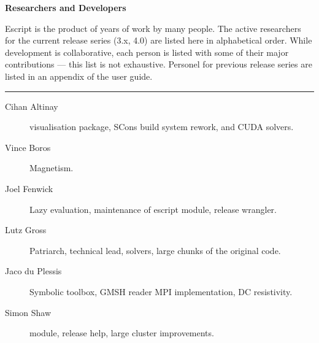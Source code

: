 
%
%
%

\vbox{}
\vfill
\begin{center}
\textbf{\Large Researchers and Developers}
\vspace{0.5cm}

Escript is the product of years of work by many people.
The active researchers for the current release series (3.x, 4.0) are listed
here in alphabetical order.
While development is collaborative, each person is listed with some of their
major contributions --- this list is not exhaustive.
Personel for previous release series are listed in an appendix of the user
guide.

\vspace{1cm}
\hrule
\vspace{1cm}
\begin{description}
\item[Cihan Altinay] \weipa visualisation package, SCons build system rework, \ripley and CUDA solvers.
\item[Vince Boros] Magnetism.
\item[Joel Fenwick] Lazy evaluation, maintenance of escript module, release wrangler.
\item[Lutz Gross] Patriarch, technical lead, solvers, large chunks of the original code.
\item[Jaco du Plessis] Symbolic toolbox, GMSH reader MPI implementation, DC resistivity.
\item[Simon Shaw] \speckley module, release help, large cluster improvements.
\end{description}
\end{center}
\vfill
\pagebreak

